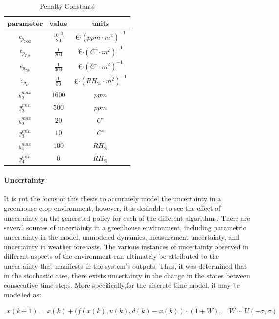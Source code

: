 \begin{table}[h]
    \centering
    \begin{tabular}{|c|c|c|}
    \hline
         parameter& value & units  \\
    \hline
        $c_{p_{\text{CO2}}}$ &$\frac{10^{-3}}{20}$ & \euro$\cdot (ppm \cdot m^2)^{-1}$ \\
        $c_{p_{T_ub}}$ & $\frac{1}{200}$& \euro$\cdot (C^{\circ} \cdot m^2)^{-1}$\\
        $c_{p_{T_lb}}$ & $\frac{1}{300}$& \euro$\cdot (C^{\circ} \cdot m^2)^{-1}$\\
        $c_{p_{H}}$ & $\frac{1}{50}$ & \euro$\cdot (RH_{\%} \cdot m^2)^{-1}$\\
        $y_2^{max}$ & $1600$ & $ppm$ \\
        $y_2^{min}$ & $500$ & $ppm$ \\
        $y_3^{max}$ & $20$ & $C^{\circ}$ \\
        $y_3^{min}$ & $10$ & $C^{\circ}$ \\
        $y_4^{max}$ & $100$ & $RH_{\%}$ \\
        $y_4^{min}$ & $0$ & $RH_{\%}$ \\       
        \hline
    \end{tabular}
    \caption{Penalty Constants}
    \label{tab:pen-constants}
\end{table}
\paragraph{Uncertainty} It is not the focus of this thesis to accurately model the uncertainty in a greenhouse crop environment, however, it is desirable to see the effect of uncertainty on the generated policy for each of the different algorithms. There are several sources of uncertainty in a greenhouse environment, including parametric uncertainty in the model, unmodeled dynamics, measurement uncertainty, and uncertainty in weather forecasts. The various instances of uncertainty observed in different aspects of the environment can ultimately be attributed to the uncertainty that manifests in the system's outputs. Thus, it was determined that in the stochastic case, there exists uncertainty in the change in the states between consecutive time steps. More specifically,for the discrete time model, it may be modelled as:

\begin{equation}
    \label{eq:uncertainty_model}
    \begin{aligned}
     x(k+1) = x(k) + (f(x(k),u(k),d(k) - x(k)) \cdot (1+W),\quad W \sim U(-\sigma, \sigma)  
    \end{aligned}
\end{equation}

